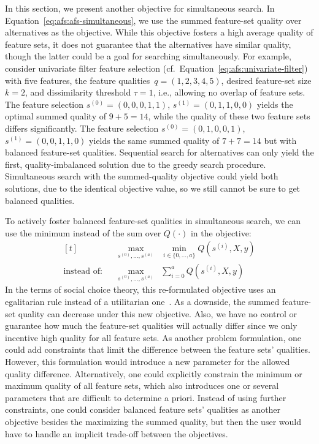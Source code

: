 \documentclass{article}
\theoremstyle{definition}
\begin{document}
In this section, we present another objective for simultaneous search.
In Equation~\ref{eq:afs:afs-simultaneous}, we use the summed feature-set quality over alternatives as the objective.
While this objective fosters a high average quality of feature sets, it does not guarantee that the alternatives have similar quality, though the latter could be a goal for searching simultaneously.
For example, consider univariate filter feature selection (cf.~Equation~\ref{eq:afs:univariate-filter}) with five features, the feature qualities~$q = (1,2,3,4,5)$, desired feature-set size $k=2$, and dissimilarity threshold $\tau = 1$, i.e., allowing no overlap of feature sets.
The feature selection $s^{(0)} = (0,0,0,1,1)$, $s^{(1)} = (0,1,1,0,0)$ yields the optimal summed quality of $9+5=14$, while the quality of these two feature sets differs significantly.
The feature selection $s^{(0)} = (0,1,0,0,1)$, $s^{(1)} = (0,0,1,1,0)$ yields the same summed quality of $7+7=14$ but with balanced feature-set qualities.
Sequential search for alternatives can only yield the first, quality-imbalanced solution due to the greedy search procedure.
Simultaneous search with the summed-quality objective could yield both solutions, due to the identical objective value, so we still cannot be sure to get balanced qualities.

To actively foster balanced feature-set qualities in simultaneous search, we can use the minimum instead of the sum over $Q(\cdot)$ in the objective:
%
\begin{equation}
	\begin{aligned}[t]
		&\quad \max_{s^{(0)}, \dots, s^{(a)}} & \min_{i \in \{0, \dots, a\}} Q(s^{(i)},X,y) \\
		\text{instead of:} &\quad \max_{s^{(0)}, \dots, s^{(a)}} & \sum_{i=0}^a Q(s^{(i)},X,y)
	\end{aligned}
	\label{eq:afs:afs-simultaneous-min-objective}
\end{equation}
%
In the terms of social choice theory, this re-formulated objective uses an egalitarian rule instead of a utilitarian one~\cite{myerson1981utilitarianism}.
As a downside, the summed feature-set quality can decrease under this new objective.
Also, we have no control or guarantee how much the feature-set qualities will actually differ since we only incentive high quality for all feature sets.
As another problem formulation, one could add constraints that limit the difference between the feature sets' qualities.
However, this formulation would introduce a new parameter for the allowed quality difference.
Alternatively, one could explicitly constrain the minimum or maximum quality of all feature sets, which also introduces one or several parameters that are difficult to determine a priori.
Instead of using further constraints, one could consider balanced feature sets' qualities as another objective besides the maximizing the summed quality, but then the user would have to handle an implicit trade-off between the objectives.
\end{document}
